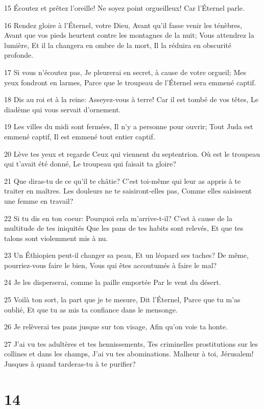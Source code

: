 \par 15 Écoutez et prêtez l'oreille! Ne soyez point orgueilleux! Car l'Éternel parle.
\par 16 Rendez gloire à l'Éternel, votre Dieu, Avant qu'il fasse venir les ténèbres, Avant que vos pieds heurtent contre les montagnes de la nuit; Vous attendrez la lumière, Et il la changera en ombre de la mort, Il la réduira en obscurité profonde.
\par 17 Si vous n'écoutez pas, Je pleurerai en secret, à cause de votre orgueil; Mes yeux fondront en larmes, Parce que le troupeau de l'Éternel sera emmené captif.
\par 18 Dis au roi et à la reine: Asseyez-vous à terre! Car il est tombé de vos têtes, Le diadème qui vous servait d'ornement.
\par 19 Les villes du midi sont fermées, Il n'y a personne pour ouvrir; Tout Juda est emmené captif, Il est emmené tout entier captif.
\par 20 Lève tes yeux et regarde Ceux qui viennent du septentrion. Où est le troupeau qui t'avait été donné, Le troupeau qui faisait ta gloire?
\par 21 Que diras-tu de ce qu'il te châtie? C'est toi-même qui leur as appris à te traiter en maîtres. Les douleurs ne te saisiront-elles pas, Comme elles saisissent une femme en travail?
\par 22 Si tu dis en ton coeur: Pourquoi cela m'arrive-t-il? C'est à cause de la multitude de tes iniquités Que les pans de tes habits sont relevés, Et que tes talons sont violemment mis à nu.
\par 23 Un Éthiopien peut-il changer sa peau, Et un léopard ses taches? De même, pourriez-vous faire le bien, Vous qui êtes accoutumés à faire le mal?
\par 24 Je les disperserai, comme la paille emportée Par le vent du désert.
\par 25 Voilà ton sort, la part que je te mesure, Dit l'Éternel, Parce que tu m'as oublié, Et que tu as mis ta confiance dans le mensonge.
\par 26 Je relèverai tes pans jusque sur ton visage, Afin qu'on voie ta honte.
\par 27 J'ai vu tes adultères et tes hennissements, Tes criminelles prostitutions sur les collines et dans les champs, J'ai vu tes abominations. Malheur à toi, Jérusalem! Jusques à quand tarderas-tu à te purifier?

\chapter{14}


